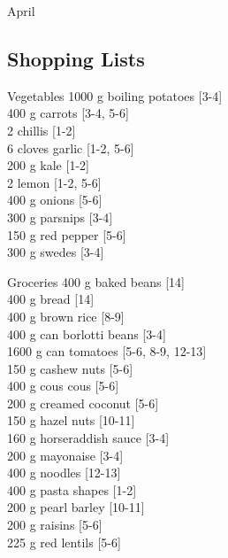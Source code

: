 \begin{menu}{April}
    \subsection*{Shopping Lists}
      \begin{shoppinglist}{Vegetables}
      1000 g boiling potatoes {\scriptsize[3-4]}\\
      400 g carrots {\scriptsize[3-4, 5-6]}\\
      2  chillis {\scriptsize[1-2]}\\
      6 cloves garlic {\scriptsize[1-2, 5-6]}\\
      200 g kale {\scriptsize[1-2]}\\
      2  lemon {\scriptsize[1-2, 5-6]}\\
      400 g onions {\scriptsize[5-6]}\\
      300 g parsnips {\scriptsize[3-4]}\\
      150 g red pepper {\scriptsize[5-6]}\\
      300 g swedes {\scriptsize[3-4]}\\
      \end{shoppinglist}%
      \begin{shoppinglist}{Groceries}
      400 g baked beans {\scriptsize[14]}\\
      400 g bread {\scriptsize[14]}\\
      400 g brown rice {\scriptsize[8-9]}\\
      400 g can borlotti beans {\scriptsize[3-4]}\\
      1600 g can tomatoes {\scriptsize[5-6, 8-9, 12-13]}\\
      150 g cashew nuts {\scriptsize[5-6]}\\
      400 g cous cous {\scriptsize[5-6]}\\
      200 g creamed coconut {\scriptsize[5-6]}\\
      150 g hazel nuts {\scriptsize[10-11]}\\
      160 g horseraddish sauce {\scriptsize[3-4]}\\
      200 g mayonaise {\scriptsize[3-4]}\\
      400 g noodles {\scriptsize[12-13]}\\
      400 g pasta shapes {\scriptsize[1-2]}\\
      200 g pearl barley {\scriptsize[10-11]}\\
      200 g raisins {\scriptsize[5-6]}\\
      225 g red lentils {\scriptsize[5-6]}\\

\end{shoppinglist}
\end{menu}
